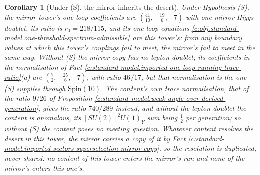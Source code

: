 \documentclass[11pt]{article}
\newtheorem{corollary}[theorem]{Corollary}
\theoremstyle{definition}
\theoremstyle{plain}
\newcommand{\changedmark}[2]{\marginpar{\raggedright\scriptsize\color{#1}#2}}
\begin{document}
\begin{corollary}[Under (S), the mirror inherits the desert]\label{c:standard-model.under-s-mirror-inherits-desert}
\changedmark{gray}{reworded}
Under Hypothesis (S), the mirror tower's one-loop coefficients are $(\tfrac{41}{10}, -\tfrac{19}{6}, -7)$ with one mirror Higgs doublet, its ratio is $r_{0} = 218/115$, and its one-loop equations \ref{c:obj.standard-model.one-threshold-spectrum-admissible} are this tower's: from any boundary values at which this tower's couplings fail to meet, the mirror's fail to meet in the same way. Without (S) the mirror copy has no lepton doublet; its coefficients in the normalisation of Fact \ref{c:standard-model.imported-one-loop-running-trace-ratio}(a) are $(\tfrac72, -\tfrac{25}{6}, -7)$, with ratio $46/17$, but that normalisation is the one (S) supplies through $\mathrm{Spin}(10)$. The content's own trace normalisation, that of the ratio $9/26$ of Proposition \ref{c:standard-model.weak-angle-over-derived-generation}, gives the ratio $740/289$ instead, and without the lepton doublet the content is anomalous, its $[SU(2)]^{2}U(1)_{Y}$ sum being $\tfrac12$ per generation; so without (S) the content poses no meeting question. Whatever content resolves the desert in this tower, the mirror carries a copy of it by Fact \ref{c:standard-model.imported-sectors-superselection-mirror-copy}, so the resolution is duplicated, never shared: no content of this tower enters the mirror's run and none of the mirror's enters this one's.
\end{corollary}
\end{document}
